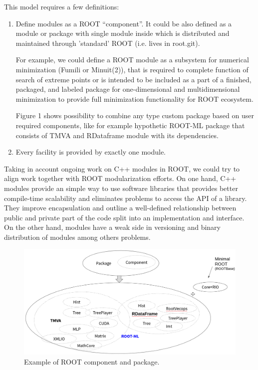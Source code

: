 \documentclass{webofc}
\begin{document}
This model requires a few definitions:
\begin{enumerate}
\item Define modules as a ROOT “component”. It could be also defined as a module or package with single module inside which is distributed and maintained through 'standard' ROOT (i.e. lives in root.git).

For example, we could define a ROOT module as a subsystem for numerical minimization (Fumili or Minuit(2)), that is required to complete function of search of extreme points or is intended to be included as a part of a finished, packaged, and labeled package for one-dimensional and multidimensional minimization to provide full minimization functionality for ROOT ecosystem.

Figure 1 shows possibility to combine any type custom package based on user required components, like for example hypothetic ROOT-ML package that consists of TMVA and RDataframe module with its dependencies.

\item Every facility is provided by exactly one module.
\end{enumerate}

Taking in account ongoing work on C++ modules in ROOT, we could try to align work together with ROOT modularization efforts. On one hand, C++ modules provide an simple way to use software libraries that provides better compile-time scalability and eliminates problems to access the API of a library. They improve encapsulation and outline a well-defined relationship between public and private part of the code split into an implementation and interface. On the other hand, modules have a weak side in versioning and binary distribution of modules among others problems.

\begin{figure}
\includegraphics[width=1.0\linewidth]{picture/1.png}
\caption{Example of ROOT component and package.}
\label{interp}
\end{figure}
\end{document}
